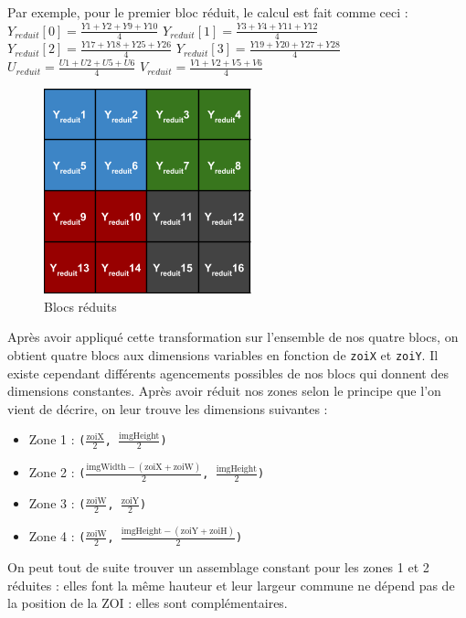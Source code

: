 \documentclass[11pt,a4paper]{article}
\begin{document}
\bigbreak
Par exemple, pour le premier bloc réduit, le calcul est fait comme ceci :
\medbreak
$Y_{reduit}[0] = \frac{Y1 + Y2 + Y9 + Y10}{4}$
\medbreak
$Y_{reduit}[1] = \frac{Y3 + Y4 + Y11 + Y12}{4}$
\medbreak
$Y_{reduit}[2] = \frac{Y17 + Y18 + Y25 + Y26}{4}$
\medbreak
$Y_{reduit}[3] = \frac{Y19 + Y20 + Y27 + Y28}{4}$
\medbreak
$U_{reduit} = \frac{U1 + U2 + U5 + U6}{4}$
\medbreak
$V_{reduit} = \frac{V1 + V2 + V5 + V6}{4}$

\bigbreak


\begin{figure}[H]
\begin{center}
\includegraphics[scale=0.5]{images/yuv4.png}
\end{center}
\caption{Blocs réduits}
\label{}
\end{figure}

\bigbreak
Après avoir appliqué cette transformation sur l'ensemble de nos quatre blocs, on obtient quatre blocs aux dimensions variables en fonction de \texttt{zoiX} et \texttt{zoiY}.
Il existe cependant différents agencements possibles de nos blocs qui donnent des dimensions constantes.
Après avoir réduit nos zones selon le principe que l'on vient de décrire, on leur trouve les dimensions suivantes :

\bigbreak
\begin{itemize}
\item{Zone 1 : \texttt{($\frac{\text{zoiX}}{2}$, $\frac{\text{imgHeight}}{2}$)}}
\item{Zone 2 : \texttt{($\frac{\text{imgWidth}-(\text{zoiX}+\text{zoiW})}{2}$, $\frac{\text{imgHeight}}{2}$)}}
\item{Zone 3 : \texttt{($\frac{\text{zoiW}}{2}$, $\frac{\text{zoiY}}{2}$)}}
\item{Zone 4 : \texttt{($\frac{\text{zoiW}}{2}$, $\frac{\text{imgHeight}-(\text{zoiY}+\text{zoiH})}{2}$)}}
\end{itemize}

\bigbreak
On peut tout de suite trouver un assemblage constant pour les zones 1 et 2 réduites : elles font la même hauteur et leur largeur commune ne dépend pas de la position de la ZOI : elles sont complémentaires.
\end{document}
